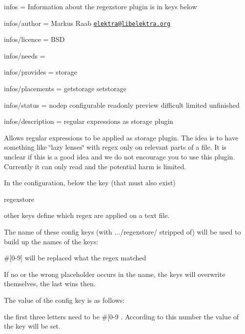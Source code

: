 
\begin{DoxyItemize}
\item infos = Information about the regexstore plugin is in keys below
\item infos/author = Markus Raab \href{mailto:elektra@libelektra.org}{\tt elektra@libelektra.\+org}
\item infos/licence = B\+SD
\item infos/needs =
\item infos/provides = storage
\item infos/placements = getstorage setstorage
\item infos/status = nodep configurable readonly preview difficult limited unfinished
\item infos/description = regular expressions as storage plugin
\end{DoxyItemize}

Allows regular expressions to be applied as storage plugin. The idea is to have something like \char`\"{}lazy lenses\char`\"{} with regex only on relevant parts of a file. It is unclear if this is a good idea and we do not encourage you to use this plugin. Currently it can only read and the potential harm is limited.

In the configuration, below the key (that must also exist)


\begin{DoxyCode}
regexstore
\end{DoxyCode}


other keys define which regex are applied on a text file.

The name of these config keys (with .../regexstore/ stripped of) will be used to build up the names of the keys\+:


\begin{DoxyItemize}
\item \#\mbox{[}0-\/9\mbox{]} will be replaced what the regex matched
\item If no or the wrong placeholder occurs in the name, the keys will overwrite themselves, the last wins then.
\end{DoxyItemize}

The value of the config key is as follows\+:


\begin{DoxyItemize}
\item the first three letters need to be \textquotesingle{}\#\mbox{[}0-\/9 \textquotesingle{}. According to this number the value of the key will be set.
\end{DoxyItemize}

